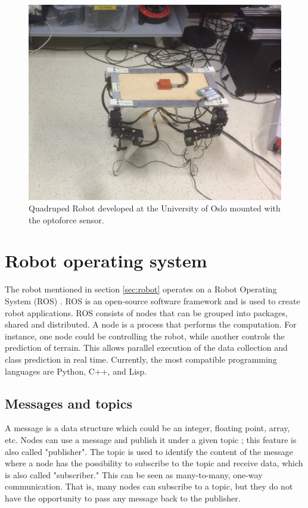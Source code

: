 \documentclass[USenglish]{ifimaster}  %
\begin{document}
\begin{figure}[h]
	\centering
	\includegraphics[width=\textwidth,height=\textheight,keepaspectratio]{Figures/Robot3}
	\caption[Quadruped robot developed at the University of Oslo]{Quadruped Robot developed at the University of Oslo mounted with the optoforce sensor.}
	\label{fig:robot}
\end{figure}
\FloatBarrier


\section{Robot operating system}
The robot mentioned in section \ref{sec:robot} operates on a Robot Operating System (ROS) \cite{ROSintro}. ROS is an open-source software framework and is used to create robot applications. ROS consists of nodes that can be grouped into packages, shared and distributed. A node is a process that performs the computation. For instance, one node could be controlling the robot, while another controls the prediction of terrain. This allows parallel execution of the data collection and class prediction in real time. Currently, the most compatible programming languages are Python, C++, and Lisp.

\subsection{Messages and topics}
A message is a data structure which could be an integer, floating point, array, etc. Nodes can use a message and publish it under a given topic \cite{ROSconcept}; this feature is also called "publisher". The topic is used to identify the content of the message where a node has the possibility to subscribe to the topic and receive data, which is also called "subscriber." This can be seen as many-to-many, one-way communication. That is, many nodes can subscribe to a topic, but they do not have the opportunity to pass any message back to the publisher.
\end{document}
